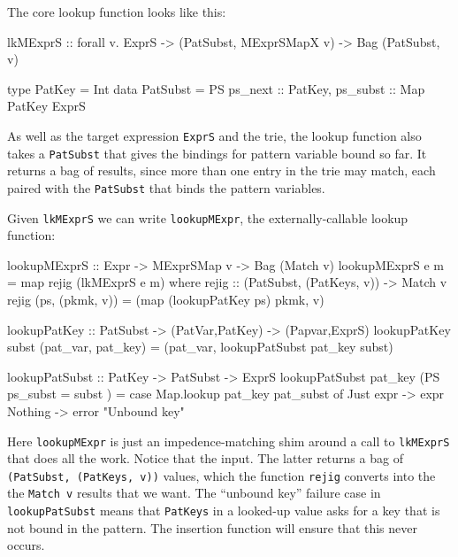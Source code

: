 \documentclass[acmsmall]{acmart}
\theoremstyle{theorem}
\theoremstyle{definition}
\theoremstyle{remark}
\begin{document}
The core lookup function looks like this:
\begin{code}
lkMExprS :: forall v. ExprS -> (PatSubst, MExprSMapX v) -> Bag (PatSubst, v)

type PatKey = Int
data PatSubst = PS { ps_next  :: PatKey, ps_subst :: Map PatKey ExprS }
\end{code}
As well as the target expression \lstinline{ExprS} and the trie, the lookup function also takes
a \lstinline{PatSubst} that gives the bindings for pattern variable bound so far.
It returns a bag of results, since more than one entry in the trie may match,
each paired with the \lstinline{PatSubst} that binds the pattern variables.

Given \lstinline{lkMExprS} we can write \lstinline{lookupMExpr},
the externally-callable lookup function:
\begin{code}
lookupMExprS :: Expr -> MExprSMap v -> Bag (Match v)
lookupMExprS e m = map rejig (lkMExprS e m)
  where
    rejig :: (PatSubst, (PatKeys, v)) -> Match v
    rejig (ps, (pkmk, v)) = (map (lookupPatKey ps) pkmk, v)

lookupPatKey :: PatSubst -> (PatVar,PatKey) -> (Papvar,ExprS)
lookupPatKey subst (pat_var, pat_key) = (pat_var, lookupPatSubst pat_key subst)

lookupPatSubst :: PatKey -> PatSubst -> ExprS
lookupPatSubst pat_key (PS { ps_subst = subst })
  = case Map.lookup pat_key pat_subst of
      Just expr -> expr
      Nothing   -> error "Unbound key"
\end{code}
Here \lstinline{lookupMExpr} is just an impedence-matching shim around
a call to \lstinline{lkMExprS} that does all the work.  Notice that the
input.  The latter returns a bag of \lstinline{(PatSubst, (PatKeys, v))}
values, which the function \lstinline{rejig} converts into the
the \lstinline{Match v} results that we want.  The ``unbound key''
failure case in \lstinline{lookupPatSubst} means that
\lstinline{PatKeys} in a looked-up value asks for a key that is not
bound in the pattern.  The insertion function will ensure that this
never occurs.
\end{document}
